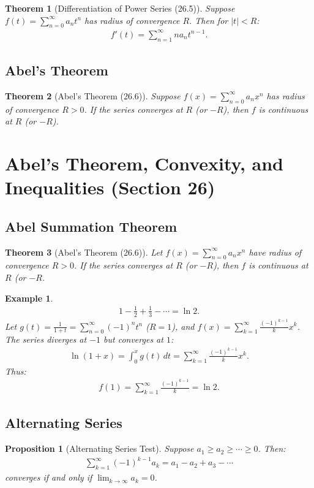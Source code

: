 \documentclass[9pt]{article}
\theoremstyle{definition}
\theoremstyle{plain}
\newtheorem{theorem}{Theorem}
\newtheorem{proposition}{Proposition}
\newtheorem{example}{Example}
\begin{document}
\begin{theorem}[Differentiation of Power Series (26.5)]
Suppose $ f(t) = \sum_{n=0}^\infty a_n t^n $ has radius of convergence $ R $. Then for $ |t| < R $:
\begin{align}
f'(t) = \sum_{n=1}^\infty n a_n t^{n-1}.
\end{align}
\end{theorem}

\subsection*{Abel’s Theorem}
\begin{theorem}[Abel’s Theorem (26.6)]
Suppose $ f(x) = \sum_{n=0}^\infty a_n x^n $ has radius of convergence $ R > 0 $. If the series converges at $ R $ (or $ -R $), then $ f $ is continuous at $ R $ (or $ -R $).
\end{theorem}
\section*{Abel’s Theorem, Convexity, and Inequalities (Section 26)}

\subsection*{Abel Summation Theorem}
\begin{theorem}[Abel’s Theorem (26.6)]
Let $ f(x) = \sum_{n=0}^\infty a_n x^n $ have radius of convergence $ R > 0 $. If the series converges at $ R $ (or $ -R $), then $ f $ is continuous at $ R $ (or $ -R $.
\end{theorem}

\begin{example}
\begin{align}
1 - \frac{1}{2} + \frac{1}{3} - \cdots = \ln 2.
\end{align}
Let $ g(t) = \frac{1}{1+t} = \sum_{n=0}^\infty (-1)^n t^n $ ($ R = 1 $), and $ f(x) = \sum_{k=1}^\infty \frac{(-1)^{k-1}}{k} x^k $. The series diverges at $ -1 $ but converges at $ 1 $:
\begin{align}
\ln(1+x) = \int_0^x g(t) \, dt = \sum_{k=1}^\infty \frac{(-1)^{k-1}}{k} x^k.
\end{align}
Thus:
\begin{align}
f(1) = \sum_{k=1}^\infty \frac{(-1)^{k-1}}{k} = \ln 2.
\end{align}
\end{example}

\subsection*{Alternating Series}
\begin{proposition}[Alternating Series Test]
Suppose $ a_1 \geq a_2 \geq \cdots \geq 0 $. Then:
\begin{align}
\sum_{k=1}^\infty (-1)^{k-1} a_k = a_1 - a_2 + a_3 - \cdots
\end{align}
converges if and only if $ \lim_{k \to \infty} a_k = 0 $.
\end{proposition}
\end{document}
